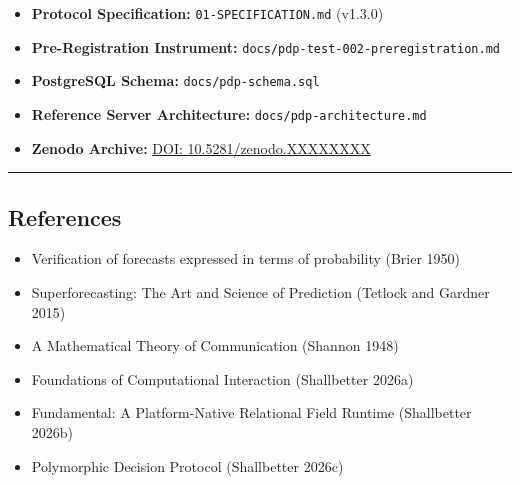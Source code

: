 \documentclass[
]{article}
\providecommand{\tightlist}{%
  \setlength{\itemsep}{0pt}\setlength{\parskip}{0pt}}
\begin{document}
\begin{itemize}
\tightlist
\item
  \textbf{Protocol Specification:} \texttt{01-SPECIFICATION.md} (v1.3.0)
\item
  \textbf{Pre-Registration Instrument:}
  \texttt{docs/pdp-test-002-preregistration.md}
\item
  \textbf{PostgreSQL Schema:} \texttt{docs/pdp-schema.sql}
\item
  \textbf{Reference Server Architecture:}
  \texttt{docs/pdp-architecture.md}
\item
  \textbf{Zenodo Archive:}
  \href{https://doi.org/10.5281/zenodo.XXXXXXXX}{DOI:
  10.5281/zenodo.XXXXXXXX}
\end{itemize}

\begin{center}\rule{0.5\linewidth}{0.5pt}\end{center}

\subsection{References}\label{references}

\begin{itemize}
\tightlist
\item
  Verification of forecasts expressed in terms of probability (Brier
  1950)
\item
  Superforecasting: The Art and Science of Prediction (Tetlock and
  Gardner 2015)
\item
  A Mathematical Theory of Communication (Shannon 1948)
\item
  Foundations of Computational Interaction (Shallbetter 2026a)
\item
  Fundamental: A Platform-Native Relational Field Runtime (Shallbetter
  2026b)
\item
  Polymorphic Decision Protocol (Shallbetter 2026c)
\end{itemize}
\end{document}
